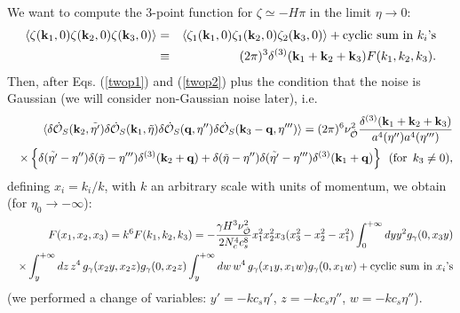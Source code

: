 \documentclass[11pt,amsmath,floats,floatfix,nofootinbib,secnumarabic, superscriptaddress, tightenlines]{revtex4}
\newcommand{\nn}{\nonumber}
\newcommand{\calo}{{\cal O}}
\begin{document}
{We want to compute the 3-point function for $\zeta\simeq -H\pi$ in the limit $\eta\to 0$:
\begin{eqnarray}\langle\zeta({\bf k}_1,0)\zeta({\bf k}_2,0)\zeta({\bf k}_3,0)\rangle&=&\langle\zeta_1({\bf k}_1,0)\zeta_1({\bf k}_2,0)\zeta_2({\bf k}_3,0)
\rangle+ \mbox{cyclic sum in $k_i$'s}\nonumber\\
&\equiv&(2\pi)^3 \delta^{(3)}({\bf k}_1+{\bf k}_2+{\bf k}_3) F(k_1,k_2,k_3). \end{eqnarray}
Then, after Eqs. (\ref{twop1}) and (\ref{twop2}) plus the condition that the noise is Gaussian (we will consider non-Gaussian noise later), i.e.
\begin{eqnarray}\label{os}&&\langle\delta\dot{ \calo}_S({\bf k}_2,\tilde{\eta'}) \delta\dot{\calo}_S({\bf k}_1,\tilde{\eta})  \delta\dot{\calo}_S({\bf q},\eta'')
\delta\dot{\calo}_S({\bf k}_3-{\bf q},\eta''')\rangle=(2\pi)^6\nu_{\dot{\calo}}^2\frac{\delta^{(3)}({\bf k}_1+{\bf k}_2+{\bf k}_3)}{a^4(\eta'')a^4(\eta''')}\\
&&\times \left\{\delta(\tilde{\eta'}-\eta'')\delta(\tilde{\eta}-\eta''')\delta^{(3)}({\bf k}_2+{\bf q})+
\delta(\tilde{\eta}-\eta'')\delta(\tilde{\eta'}-\eta''')\delta^{(3)}({\bf k}_1+{\bf q})\right\}\,\,\,(\mbox{for} \,\,\,k_3\neq 0)\nn,
\end{eqnarray}
defining $x_i=k_i/k$, with $k$ an arbitrary scale with units of momentum, we obtain (for $\eta_0\to -\infty$):
\begin{eqnarray}\label{fdeltagooshape}
&&F(x_1,x_2,x_3)= k^6 F(k_1,k_2,k_3)=-\frac{\gamma H^3\nu_{\dot{\calo}}^2}{2N_c^4c_s^8}x_1^2x_2^2x_3(x_3^2-x_2^2-x_1^2)\int_{0}^{+\infty} dy y^2  g_{\gamma}(0,x_3 y)\\
&&\times\int_{y}^{+\infty} dz\,{z}^4 \,g_{\gamma}(x_2 y,x_2 z)  g_{\gamma}(0,x_2 z)\int_{y}^{+\infty} dw\,{w}^4 \,g_{\gamma}(x_1 y,x_1 w) g_{\gamma}(0,x_1 w)+\mbox{cyclic sum in  $x_i$'s}\nn
\end{eqnarray} (we performed a change of variables: $y'=-kc_s\eta'$, $z=-kc_s\eta''$, $w=-kc_s\eta''$).\\

}
\end{document}
